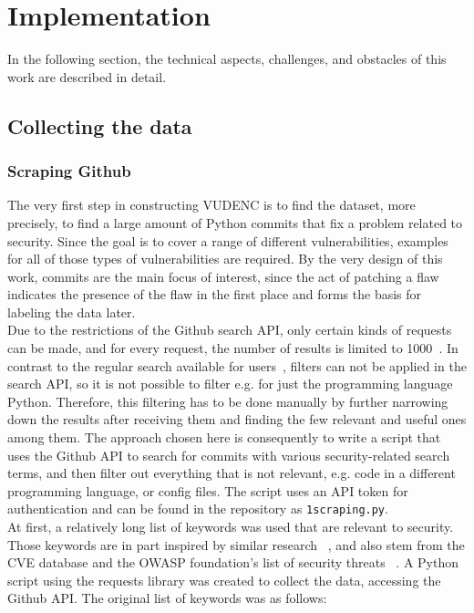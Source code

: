 \documentclass[
	a4paper,
	pagesize,
	pdftex,
	12pt,
	twoside, %
	BCOR=5mm, %
	ngerman,
	fleqn,
	final,
	]{scrartcl}
\begin{document}
\newpage
\section{Implementation}
In the following section, the technical aspects, challenges, and obstacles of this work are described in detail.

\subsection{Collecting the data}
\subsubsection{Scraping Github}
The very first step in constructing VUDENC is to find the dataset, more precisely, to find a large amount of Python commits that fix a problem related to security. Since the goal is to cover a range of different vulnerabilities, examples for all of those types of vulnerabilities are required. By the very design of this work, commits are the main focus of interest, since the act of patching a flaw indicates the presence of the flaw in the first place and forms the basis for labeling the data later.\\	
Due to the restrictions of the Github search API, only certain kinds of requests can be made, and for every request, the number of results is limited to 1000~\cite{Github.com.2}. In contrast to the regular search available for users~\cite{Github.com.2019}, filters can not be applied in the search API, so it is not possible to filter e.g. for just the programming language Python. Therefore, this filtering has to be done manually by further narrowing down the results after receiving them and finding the few relevant and useful ones among them.
The approach chosen here is consequently to write a script that uses the Github API to search for commits with various security-related search terms, and then filter out everything that is not relevant, e.g. code in a different programming language, or config files. The script uses an API token for authentication and can be found in the repository as \texttt{1scraping.py}.\\
At first, a relatively long list of keywords was used that are relevant to security. Those keywords are in part inspired by similar research ~\cite{Zhou.2017}, and also stem from the CVE database \cite{CVE} and the OWASP foundation's list of security threats ~\cite{OWASPFoundation.}. A Python script using the requests library was created to collect the data, accessing the Github API. The original list of keywords was as follows:
\end{document}
